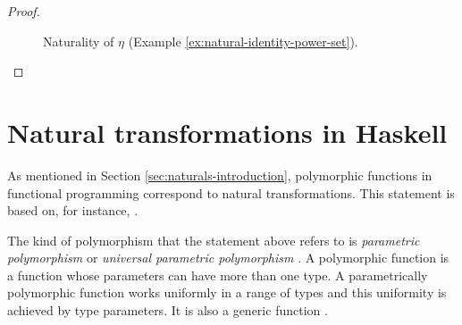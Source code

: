 \begin{example}
\begin{proof}
    \begin{figure}[htbp]
      \begin{center}
      \end{center}
      \caption{Naturality of $\eta$ (Example \ref{ex:natural-identity-power-set}).}
      \label{fig:naturality-eta}
    \end{figure}

  \end{proof}

\end{example}

\section{Natural transformations in Haskell}
\label{sec:naturals-haskell}


As mentioned in Section \ref{sec:naturals-introduction}, polymorphic
functions in functional programming correspond to natural
transformations. This statement is based on, for instance,
\parencites[34]{bird-demoor-1997}[78]{elkins-2009}[435, 436]{poigne-1992}[48,
  49]{rydeheard-1986}[113]{rydeheard-1988}[350]{wadler-1989}.

The kind of polymorphism that the statement above refers to is
\emph{parametric polymorphism}
\parencite[following][37]{strachey-2000} or \emph{universal parametric
  polymorphism} \parencite[following][4]{cardelli-1985}. A polymorphic
function is a function whose parameters can have more than one type. A
parametrically polymorphic function works uniformly in a range of
types and this uniformity is achieved by type parameters. It is also a
generic function \parencite[4, 5]{cardelli-1985}.

